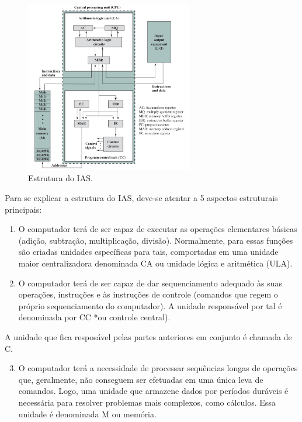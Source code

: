 \documentclass{article}
\begin{document}
\begin{figure}[h]
    \centering
    \includegraphics[width=0.65\textwidth]{ias.png}
    \caption{Estrutura do IAS.}
\end{figure}

Para se explicar a estrutura do IAS, deve-se atentar a 5 aspectos estruturais
principais:

\begin{enumerate}
    \item O computador terá de ser capaz de executar as operações elementares
        básicas (adição, subtração, multiplicação, divisão). Normalmente, para
        essas funções são criadas unidades específicas para tais, comportadas em
        uma unidade maior centralizadora denominada CA ou unidade lógica e
        aritmética (ULA).

    \item O computador terá de ser capaz de dar sequenciamento adequado às suas
        operações, instruções e às instruções de controle (comandos que regem o
        próprio sequenciamento do computador). A unidade responsável por tal é
        denominada por CC *ou controle central).
\end{enumerate}

        A unidade que fica resposável pelas partes anteriores em conjunto é
        chamada de C. 

\begin{enumerate}
        \setcounter{enumi}{2}
    \item O computador terá a necessidade de processar sequências longas de
        operações que, geralmente, não conseguem ser efetuadas em uma única
        leva de comandos. Logo, uma unidade que armazene dados por períodos
        duráveis é necessária para resolver problemas mais complexos, como
        cálculos. Essa unidade é denominada M ou memória.
\end{enumerate}
\end{document}

